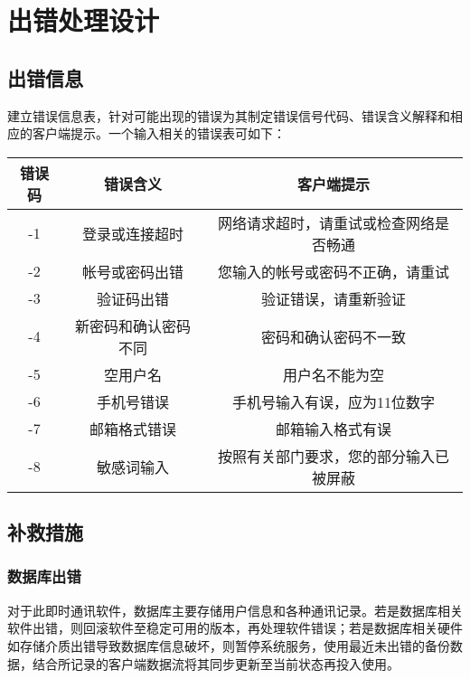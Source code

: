 \chapter{出错处理设计}
\section{出错信息}
建立错误信息表，针对可能出现的错误为其制定错误信号代码、错误含义解释和相应的客户端提示。一个输入相关的错误表可如下：

\begin{tabular}{|c|c|c|}
\hline

错误码&错误含义&客户端提示 \\

\hline

-1&登录或连接超时&网络请求超时，请重试或检查网络是否畅通 \\

\hline

-2&帐号或密码出错&您输入的帐号或密码不正确，请重试 \\

\hline

-3&验证码出错&验证错误，请重新验证 \\

\hline

-4&新密码和确认密码不同&密码和确认密码不一致 \\

\hline

-5&空用户名&用户名不能为空 \\

\hline

-6&手机号错误&手机号输入有误，应为11位数字 \\

\hline

-7&邮箱格式错误&邮箱输入格式有误 \\

\hline

-8&敏感词输入&按照有关部门要求，您的部分输入已被屏蔽 \\

\hline

\end{tabular}


\section{补救措施}
\subsection{数据库出错}
对于此即时通讯软件，数据库主要存储用户信息和各种通讯记录。若是数据库相关软件出错，则回滚软件至稳定可用的版本，再处理软件错误；若是数据库相关硬件如存储介质出错导致数据库信息破坏，则暂停系统服务，使用最近未出错的备份数据，结合所记录的客户端数据流将其同步更新至当前状态再投入使用。

